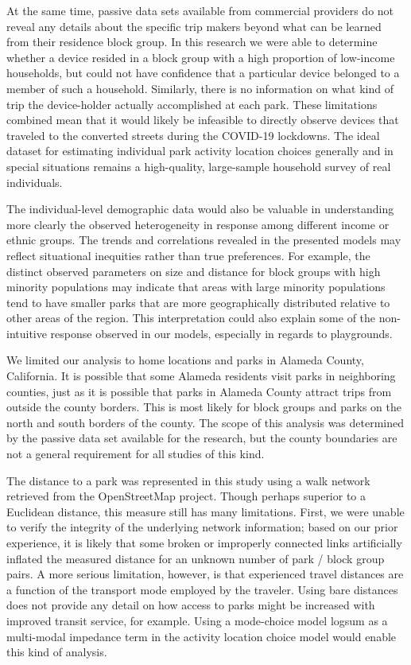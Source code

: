 \documentclass[3p, authoryear, review]{elsarticle} %
\begin{document}
At the same time, passive data sets available from commercial providers do not
reveal any details about the specific trip makers beyond what can be learned
from their residence block group. In this research we were able to determine
whether a device resided in a block group with a high proportion of low-income
households, but could not have confidence that a particular device belonged to a
member of such a household. Similarly, there is no information on what kind of
trip the device-holder actually accomplished at each park. These limitations
combined mean that it would likely be infeasible to directly observe devices
that traveled to the converted streets during the COVID-19 lockdowns. The ideal
dataset for estimating individual park activity location choices generally and
in special situations remains a high-quality, large-sample household survey of
real individuals.

The individual-level demographic data would also be valuable in understanding
more clearly the observed heterogeneity in response among different income or
ethnic groups. The trends and correlations revealed in the presented models may
reflect situational inequities rather than true preferences. For example, the
distinct observed parameters on size and distance for block groups with high
minority populations may indicate that areas with large minority populations
tend to have smaller parks that are more geographically distributed relative to
other areas of the region. This interpretation could also explain some of the
non-intuitive response observed in our models, especially in regards to
playgrounds.

We limited our analysis to home locations and parks in Alameda County,
California. It is possible that some Alameda residents visit parks in
neighboring counties, just as it is possible that parks in Alameda County
attract trips from outside the county borders. This is most likely for block
groups and parks on the north and south borders of the county. The scope of this
analysis was determined by the passive data set available for the research, but
the county boundaries are not a general requirement for all studies of this
kind.

The distance to a park was represented in this study using a walk network
retrieved from the OpenStreetMap project. Though perhaps superior to a Euclidean
distance, this measure still has many limitations. First, we were unable to
verify the integrity of the underlying network information; based on our prior
experience, it is likely that some broken or improperly connected links
artificially inflated the measured distance for an unknown number of park /
block group pairs. A more serious limitation, however, is that experienced
travel distances are a function of the transport mode employed by the traveler.
Using bare distances does not provide any detail on how access to parks might be
increased with improved transit service, for example. Using a mode-choice model
logsum as a multi-modal impedance term in the activity location choice model
would enable this kind of analysis.
\end{document}
